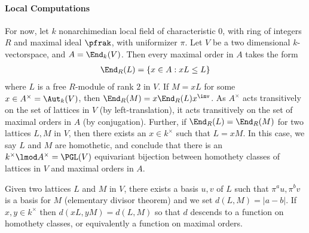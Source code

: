 \documentclass[draft]{article}
\begin{document}
\paragraph*{Local Computations} 
For now, let $k$ nonarchimedian local field of characteristic $0$, with ring of integers $R$ and maximal ideal $\pfrak$, with uniformizer $\pi$. Let $V$ be a two dimensional $k$-vectorspace, and $A = \End_k(V)$. Then every maximal order in $A$ takes the form 
\begin{align*}
    \End_R(L) = \{ x \in A : xL\leq L\}
\end{align*}
where $L$ is a free $R$-module of rank $2$ in $V$. If $M = xL$ for some $x\in A^\times = \Aut_k(V)$, then $\End_R(M) = x\End_R(L)x^\inv$. As $A^\times$ acts transitively on the set of lattices in $V$ (by left-translation), it acts transitively on the set of maximal orders in $A$ (by conjugation). Further, if $\End_R(L)=\End_R(M)$ for two lattices $L,M$ in $V$, then there exists an $x \in k^\times$ such that $L = x M$. In this case, we say $L$ and $M$ are homothetic, and conclude that there is an $k^\times \lmod A^\times = \PGL(V)$ equivariant bijection between homothety classes of lattices in $V$ and maximal orders in $A$. 

Given two lattices $L$ and $M$ in $V$, there exists a basis $u,v$ of $L$ such that $\pi^a u , \pi^b v$ is a basis for $M$ (elementary divisor theorem) and we set $d(L,M) = |a-b|$. If $x,y\in k^\times$ then $d(xL,yM)=d(L,M)$ so that $d$ descends to a function on homothety classes, or equivalently a function on maximal orders. 


\cite{sallyFourierTransformOrbital1983}


\end{document}
